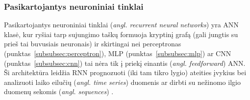 \documentclass{VUMIFPSbakalaurinis}
\begin{document}
\subsubsection{Pasikartojantys neuroniniai tinklai}\label{subsubsec:rnn}
{
	Pasikartojantys neuroniniai tinklai (\textit{angl. recurrent neural networks}) yra ANN klasė, kur ryšiai tarp sujungimo taškų formuoja kryptinį grafą (gali jungtis su prieš tai buvusiais neuronais) ir skirtingai nei perceptronas (punktas~\ref{subsubsec:perceptron}), MLP (punktas~\ref{subsubsec:mlp}) ar CNN (punktas~\ref{subsubsec:cnn}) tai nėra tik į priekį einantis (\textit{angl. feedforward}) ANN. Ši architektūra leidžia RNN  prognozuoti (iki tam tikro lygio) ateities įvykius bei analizuoti laiko eilučių (\textit{angl. time series}) duomenis ar dirbti su nežinomo ilgio duomenų sekomis (\textit{angl. sequences}) \cite{handson}.
}
\end{document}
